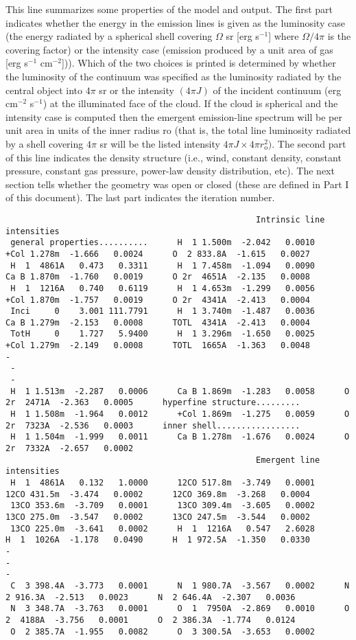 This line summarizes some properties of the model and output.
The first
part indicates whether the energy in the emission lines is given as the
luminosity case (the energy radiated by a spherical shell covering
$\Omega$ sr [erg s$^{-1}$] where $\Omega/4\pi$ is the covering factor)
or the intensity case (emission
produced by a unit area of gas [erg s$^{-1}$ cm$^{-2}$])).
Which of the two choices
is printed is determined by whether the luminosity of the continuum was
specified as the luminosity radiated by the central object into $4\pi$ sr
or
the intensity $(4\pi J)$ of the incident continuum (erg cm$^{-2}$ s$^{-1}$) at the
illuminated face of the cloud.
If the cloud is spherical and the intensity
case is computed then the emergent emission-line spectrum will be per unit
area in units of the inner radius ro (that is, the total line luminosity
radiated by a shell covering $4\pi$ sr will be the listed intensity
$4\pi J \times 4\pi r_{\mathrm{o}}^2)$.
The second part of this line indicates the density structure (i.e.,
wind, constant density, constant pressure, constant gas pressure, power-law
density distribution, etc).
The next section tells whether the geometry
was open or closed (these are defined in Part I of this document).
The last part indicates the iteration number.
{\setverbatimfontsize{\tiny}
\begin{verbatim}
                                                   Intrinsic line intensities
 general properties..........      H  1 1.500m  -2.042   0.0010      +Col 1.278m  -1.666   0.0024      O  2 833.8A  -1.615   0.0027
 H  1  4861A   0.473   0.3311      H  1 7.458m  -1.094   0.0090      Ca B 1.870m  -1.760   0.0019      O 2r  4651A  -2.135   0.0008
 H  1  1216A   0.740   0.6119      H  1 4.653m  -1.299   0.0056      +Col 1.870m  -1.757   0.0019      O 2r  4341A  -2.413   0.0004
 Inci     0    3.001 111.7791      H  1 3.740m  -1.487   0.0036      Ca B 1.279m  -2.153   0.0008      TOTL  4341A  -2.413   0.0004
 TotH     0    1.727   5.9400      H  1 3.296m  -1.650   0.0025      +Col 1.279m  -2.149   0.0008      TOTL  1665A  -1.363   0.0048
-
 -
 -
 H  1 1.513m  -2.287   0.0006      Ca B 1.869m  -1.283   0.0058      O 2r  2471A  -2.363   0.0005      hyperfine structure.........
 H  1 1.508m  -1.964   0.0012      +Col 1.869m  -1.275   0.0059      O 2r  7323A  -2.536   0.0003      inner shell.................
 H  1 1.504m  -1.999   0.0011      Ca B 1.278m  -1.676   0.0024      O 2r  7332A  -2.657   0.0002
                                                   Emergent line intensities
 H  1  4861A   0.132   1.0000      12CO 517.8m  -3.749   0.0001      12CO 431.5m  -3.474   0.0002      12CO 369.8m  -3.268   0.0004
 13CO 353.6m  -3.709   0.0001      13CO 309.4m  -3.605   0.0002      13CO 275.0m  -3.547   0.0002      13CO 247.5m  -3.544   0.0002
 13CO 225.0m  -3.641   0.0002      H  1  1216A   0.547   2.6028           H  1  1026A  -1.178   0.0490      H  1 972.5A  -1.350   0.0330
-
-
-
 C  3 398.4A  -3.773   0.0001      N  1 980.7A  -3.567   0.0002      N  2 916.3A  -2.513   0.0023      N  2 646.4A  -2.307   0.0036
 N  3 348.7A  -3.763   0.0001      O  1  7950A  -2.869   0.0010      O  2  4188A  -3.756   0.0001      O  2 386.3A  -1.774   0.0124
 O  2 385.7A  -1.955   0.0082      O  3 300.5A  -3.653   0.0002
\end{verbatim}
}

